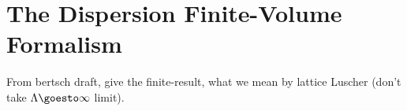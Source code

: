 \section{The Dispersion \Luscher Finite-Volume Formalism}\label{sec:formalism/dispersion}

From bertsch draft, give the finite-\nstep result, what we mean by lattice Luscher (don't take $\Lambda\goesto\infty$ limit).
